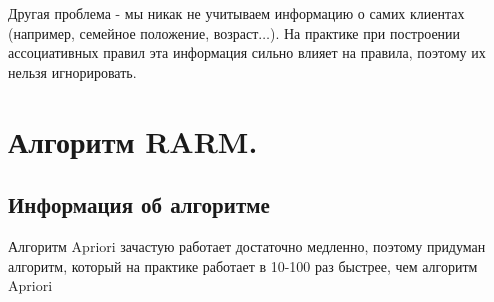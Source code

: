 Другая проблема - мы никак не учитываем информацию о самих клиентах (например, семейное положение, возраст\(\ldots\)). На практике при построении ассоциативных правил эта информация сильно влияет на правила, поэтому их нельзя игнорировать.

\section{Алгоритм RARM.}

\subsection{Информация об алгоритме}

Алгоритм Apriori зачастую работает достаточно медленно, поэтому придуман алгоритм, который на практике работает в 10-100 раз быстрее, чем алгоритм Apriori

